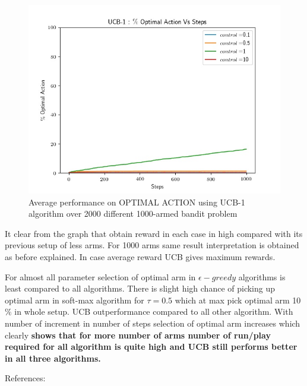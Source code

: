 \documentclass[preprint,12pt]{elsarticle}
\begin{document}
	
	\begin{figure}[H]
		\centering
		\includegraphics[scale=0.7]{./optimal_ucb_1000.jpg}
		\hspace{0.25cm}
		\caption{Average performance on OPTIMAL ACTION using UCB-1 algorithm over 2000 different 1000-armed bandit problem}
		\label{fig2:ucb_opt_1000}
	\end{figure}
	
	It clear from the graph that obtain reward in each case in high compared with its previous setup of less arms. For 1000 arms same result interpretation is obtained as before explained. In case average reward UCB gives maximum rewards. 
	
	For almost all parameter selection of optimal arm in $\epsilon - greedy $ algorithms is least compared to all algorithms. There is slight high chance of picking up optimal arm in soft-max algorithm for $\tau=0.5$ which at max pick optimal arm 10$\%$ in whole setup. UCB outperformance compared to all other algorithm. With number of increment in number of steps selection of optimal arm increases which clearly \textbf{shows that for more number of arms number of run/play required for all algorithm is quite high and UCB still performs better in all three algorithms.
}
				 

			References:
					
					
\end{document}
